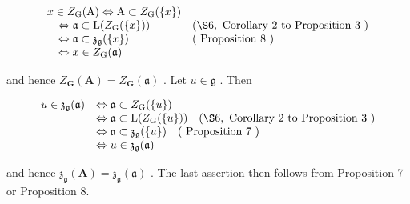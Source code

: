 \[
\begin{array}{l l} x \in Z _ {\mathrm{G}} (\mathrm{A}) \Leftrightarrow \mathrm{A} \subset Z _ {\mathrm{G}} (\{x \}) \\ \quad \Leftrightarrow \mathfrak {a} \subset \mathrm{L} (Z _ {\mathrm{G}} (\{x \})) & (\S 6, \text { Corollary   2   to   Proposition   3 }) \\ \quad \Leftrightarrow \mathfrak {a} \subset \mathfrak {z}_ {\mathfrak {g}} (\{x \}) & (\text { Proposition   8 }) \\ \quad \Leftrightarrow x \in Z _ {\mathrm{G}} (\mathfrak {a}) \end{array}
\]

and hence \(Z_{\mathbf{G}}(\mathbf{A}) = Z_{\mathbf{G}}(\mathfrak{a})\) . Let \(u \in \mathfrak{g}\) . Then

\[
\begin{array}{r l} u \in \mathfrak{z}_{\mathfrak{g}}(\mathfrak{a}) & \Leftrightarrow \mathfrak{a} \subset Z_{\mathrm{G}} (\{u\}) \\ & \Leftrightarrow \mathfrak{a} \subset \mathrm{L} (Z_{\mathrm{G}} (\{u\})) \quad (\S 6, \text { Corollary   2   to   Proposition   3 }) \\ & \Leftrightarrow \mathfrak{a} \subset \mathfrak{z}_{\mathfrak{g}} (\{u\}) \quad (\text { Proposition   7 }) \\ & \Leftrightarrow u \in \mathfrak{z}_{\mathfrak{g}} (\mathfrak{a}) \end{array}
\]

and hence \(\mathfrak{z}_{\mathfrak{g}}(\mathbf{A}) = \mathfrak{z}_{\mathfrak{g}}(\mathfrak{a})\) . The last assertion then follows from Proposition 7 or Proposition 8.

